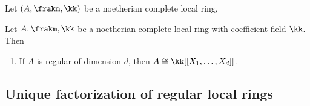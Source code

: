     \begin{theorem}\label{thm: Hensel's Lemma}
        Let \((A,\frakm, \kk)\) be a noetherian complete local ring, 
    \end{theorem}

    \begin{theorem}\label{thm: Cohen Structure Theorem}
        Let \(A,\frakm,\kk\) be a noetherian complete local ring with coefficient field \(\kk\).
        Then 
        \begin{enumerate}
            \item If \(A\) is regular of dimension \(d\), then \(A \cong \kk[[X_1, \ldots, X_d]]\).
        \end{enumerate}
    \end{theorem}


\subsection{Unique factorization of regular local rings}




